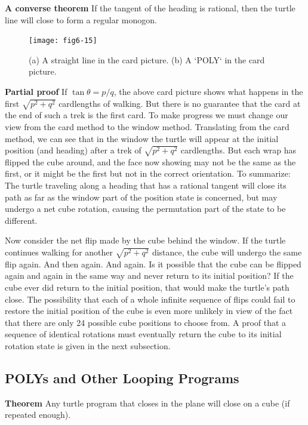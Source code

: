\documentclass{book}
\begin{document}
\textbf{A converse theorem} If the tangent of the heading is rational, then the
turtle line will close to form a regular monogon.


\begin{figure}
\begin{center}
\texttt{[image: fig6-15]}
\caption{(a) A straight line in the card picture. (b) A \textsc{`POLY`} in the card picture.}
\end{center}
\end{figure}

\textbf{Partial proof} If $\tan \theta = p / q$, the above card picture shows what happens
in the first $\sqrt{p^2 + q^2}$ cardlengths of walking. But there is no guarantee
that the card at the end of such a trek is the first card. To make progress
we must change our view from the card method to the window method.
Translating from the card method, we can see that in the window the
turtle will appear at the initial position (and heading) after a trek of
$\sqrt{p^2 + q^2}$ cardlengths. But each wrap has flipped the cube around, and
the face now showing may not be the same as the first, or it might be
the first but not in the correct orientation. To summarize: The turtle
traveling along a heading that has a rational tangent will close its path
as far as the window part of the position state is concerned, but may
undergo a net cube rotation, causing the permutation part of the state
to be different.

Now consider the net flip made by the cube behind the window. If
the turtle continues walking for another $\sqrt{p^2 + q^2}$ distance, the cube
will undergo the same flip again. And then again. And again. Is it
possible that the cube can be flipped again and again in the same way
and never return to its initial position? If the cube ever did return to the
initial position, that would make the turtle's path close. The possibility
that each of a whole infinite sequence of flips could fail to restore the
initial position of the cube is even more unlikely in view of the fact that
there are only 24 possible cube positions to choose from. A proof that
a sequence of identical rotations must eventually return the cube to its
initial rotation state is given in the next subsection.

\subsection{POLYs and Other Looping Programs}

\noindent \textbf{Theorem} Any turtle program that closes in the plane will close on a cube
(if repeated enough).
\end{document}
